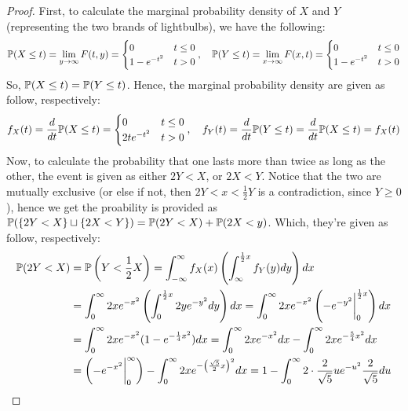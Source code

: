\documentclass{article}
\begin{document}
\begin{proof}
    First, to calculate the marginal probability density of $X$ and $Y$ (representing the two brands of lightbulbs), we have the following:
    \begin{align}
        \mathbb{P}(X\leq t) = \lim_{y\rightarrow\infty}F(t,y) = \begin{cases}
            0 & t\leq 0\\
            1-e^{-t^2} & t>0
        \end{cases},\quad \mathbb{P}(Y\leq t)=\lim_{x\rightarrow \infty}F(x,t) = \begin{cases}
            0 & t\leq 0\\
            1-e^{-t^2} & t>0
        \end{cases}
    \end{align}
    So, $\mathbb{P}(X\leq t)=\mathbb{P}(Y\leq t)$. Hence, the marginal probability density are given as follow, respectively:
    \begin{align}
        f_X(t) = \frac{d}{dt}\mathbb{P}(X\leq t) = \begin{cases}
            0 & t\leq 0\\
            2te^{-t^2} & t>0
        \end{cases},\quad f_Y(t) = \frac{d}{dt}\mathbb{P}(Y\leq t) = \frac{d}{dt}\mathbb{P}(X\leq t) = f_X(t)
    \end{align}
    Now, to calculate the probability that one lasts more than twice as long as the other, the event is given as either $2Y<X$, or $2X<Y$. Notice that the two are mutually exclusive (or else if not, then $2Y<x<\frac{1}{2}Y$ is a contradiction, since $Y\geq 0$), hence we get the proability is provided as $\mathbb{P}(\{2Y<X\}\sqcup \{2X<Y\}) = \mathbb{P}(2Y<X)+\mathbb{P}(2X<y)$. Which, they're given as follow, respectively:
    \begin{align}
        \PP(2Y<X) &= \PP\left(Y<\frac{1}{2}X\right) = \int_{-\infty}^{\infty}f_X(x) \left(\int_{\infty}^{\frac{1}{2}x}f_Y(y)dy\right)dx\\
        &= \int_{0}^{\infty}2xe^{-x^2}\left(\int_{0}^{\frac{1}{2}x}2ye^{-y^2}dy\right)dx = \int_{0}^{\infty}2xe^{-x^2}\left(-e^{-y^2}\bigg|_{0}^{\frac{1}{2}x}\right)dx\\
        &= \int_{0}^{\infty}2xe^{-x^2}(1-e^{-\frac{1}{4}x^2})dx = \int_{0}^{\infty}2xe^{-x^2}dx - \int_{0}^{\infty}2xe^{-\frac{5}{4}x^2}dx\\
        &= \left(-e^{-x^2}\bigg|_{0}^{\infty}\right) - \int_{0}^{\infty}2xe^{-\left(\frac{\sqrt{5}}{2}x\right)^2}dx = 1-\int_{0}^{\infty}2\cdot \frac{2}{\sqrt{5}}ue^{-u^2}\frac{2}{\sqrt{5}}du\\

\end{align}
\end{proof}
\end{document}
